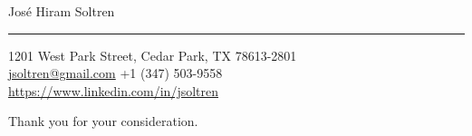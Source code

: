 \documentclass[11pt]{letter}
\begin{document}
\thispagestyle{empty} %


\signature{Jos\'e Hiram Soltren} %
\longindentation=0pt             %
\let\raggedleft\raggedright      %

\begin{letter}

\begin{flushleft}
{\LARGE\sffamily Jos\'e Hiram Soltren}
\end{flushleft}
\medskip\hrule height 1pt
\begin{flushright}
\hfill 1201 West Park Street, Cedar Park, TX 78613-2801 \\
\hfill {} \href{mailto:jsoltren@gmail.com}{jsoltren@gmail.com}
        +1 (347) 503-9558 \\
\hfill {} \url{https://www.linkedin.com/in/jsoltren}
\end{flushright}
\vfill %



Thank you for your consideration.

\end{letter}
\end{document}
